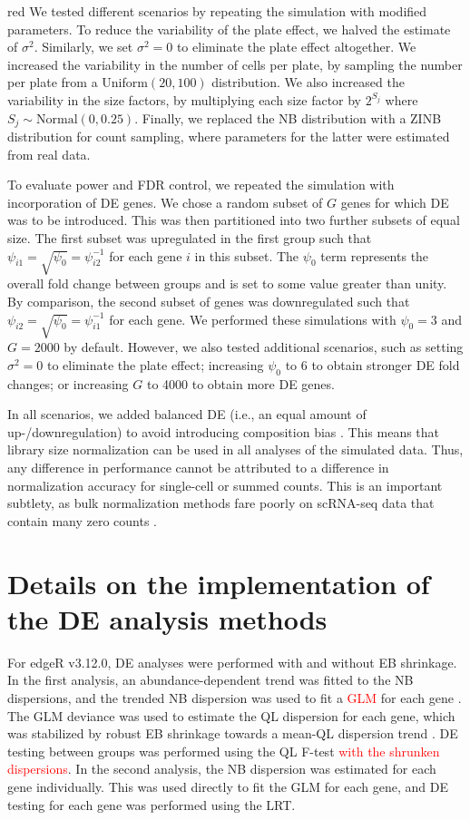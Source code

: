 \documentclass{article}
\newcommand\revised[1]{\textcolor{red}{#1}}
\begin{document}
\begin{color}{red}
We tested different scenarios by repeating the simulation with modified parameters.
To reduce the variability of the plate effect, we halved the estimate of $\sigma^2$. 
Similarly, we set $\sigma^2=0$ to eliminate the plate effect altogether.
We increased the variability in the number of cells per plate, by sampling the number per plate from a Uniform$(20, 100)$ distribution.
We also increased the variability in the size factors, by multiplying each size factor by $2^{S_j}$ where $S_j \sim \mbox{Normal}(0, 0.25)$.
Finally, we replaced the NB distribution with a ZINB distribution for count sampling, where parameters for the latter were estimated from real data.

To evaluate power and FDR control, we repeated the simulation with incorporation of DE genes.
We chose a random subset of $G$ genes for which DE was to be introduced.
This was then partitioned into two further subsets of equal size.
The first subset was upregulated in the first group such that $\psi_{i1} = \sqrt{\psi_0} = \psi_{i2}^{-1}$ for each gene $i$ in this subset.
The $\psi_0$ term represents the overall fold change between groups and is set to some value greater than unity.
By comparison, the second subset of genes was downregulated such that $\psi_{i2} = \sqrt{\psi_0} = \psi_{i1}^{-1}$ for each gene.
We performed these simulations with $\psi_0 =3$ and $G=2000$ by default.
However, we also tested additional scenarios, such as setting $\sigma^2=0$ to eliminate the plate effect; increasing $\psi_0$ to 6 to obtain stronger DE fold changes; or increasing $G$ to 4000 to obtain more DE genes.

In all scenarios, we added balanced DE (i.e., an equal amount of up-/downregulation) to avoid introducing composition bias \citep{robinson2010scaling}.
This means that library size normalization can be used in all analyses of the simulated data.
Thus, any difference in performance cannot be attributed to a difference in normalization accuracy for single-cell or summed counts.
This is an important subtlety, as bulk normalization methods fare poorly on scRNA-seq data that contain many zero counts \citep{lun2016pooling}.
\end{color}

\section{Details on the implementation of the DE analysis methods}
For edgeR v3.12.0, DE analyses were performed with and without EB shrinkage.
In the first analysis, an abundance-dependent trend was fitted to the NB dispersions, and the trended NB dispersion was used to fit a \revised{GLM} for each gene \citep{mccarthy2012differential}.
The GLM deviance was used to estimate the QL dispersion for each gene, which was stabilized by robust EB shrinkage towards a mean-QL dispersion trend \citep{lund2012detecting}.
DE testing between groups was performed using the QL F-test \revised{with the shrunken dispersions}.
In the second analysis, the NB dispersion was estimated for each gene individually.
This was used directly to fit the GLM for each gene, and DE testing for each gene was performed using the LRT.
\end{document}
